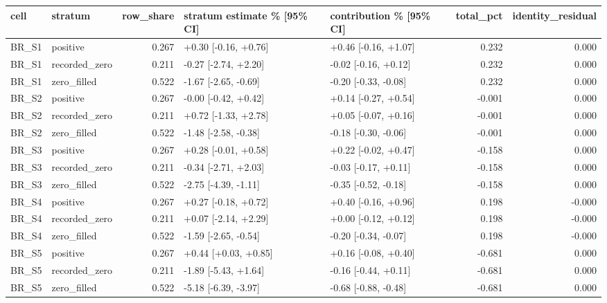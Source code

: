 \begin{tabular}{llrllrr}
\toprule
cell & stratum & row\_share & stratum estimate \% [95\% CI] & contribution \% [95\% CI] & total\_pct & identity\_residual \\
\midrule
BR\_S1 & positive & 0.267 & +0.30 [-0.16, +0.76] & +0.46 [-0.16, +1.07] & 0.232 & 0.000 \\
BR\_S1 & recorded\_zero & 0.211 & -0.27 [-2.74, +2.20] & -0.02 [-0.16, +0.12] & 0.232 & 0.000 \\
BR\_S1 & zero\_filled & 0.522 & -1.67 [-2.65, -0.69] & -0.20 [-0.33, -0.08] & 0.232 & 0.000 \\
BR\_S2 & positive & 0.267 & -0.00 [-0.42, +0.42] & +0.14 [-0.27, +0.54] & -0.001 & 0.000 \\
BR\_S2 & recorded\_zero & 0.211 & +0.72 [-1.33, +2.78] & +0.05 [-0.07, +0.16] & -0.001 & 0.000 \\
BR\_S2 & zero\_filled & 0.522 & -1.48 [-2.58, -0.38] & -0.18 [-0.30, -0.06] & -0.001 & 0.000 \\
BR\_S3 & positive & 0.267 & +0.28 [-0.01, +0.58] & +0.22 [-0.02, +0.47] & -0.158 & 0.000 \\
BR\_S3 & recorded\_zero & 0.211 & -0.34 [-2.71, +2.03] & -0.03 [-0.17, +0.11] & -0.158 & 0.000 \\
BR\_S3 & zero\_filled & 0.522 & -2.75 [-4.39, -1.11] & -0.35 [-0.52, -0.18] & -0.158 & 0.000 \\
BR\_S4 & positive & 0.267 & +0.27 [-0.18, +0.72] & +0.40 [-0.16, +0.96] & 0.198 & -0.000 \\
BR\_S4 & recorded\_zero & 0.211 & +0.07 [-2.14, +2.29] & +0.00 [-0.12, +0.12] & 0.198 & -0.000 \\
BR\_S4 & zero\_filled & 0.522 & -1.59 [-2.65, -0.54] & -0.20 [-0.34, -0.07] & 0.198 & -0.000 \\
BR\_S5 & positive & 0.267 & +0.44 [+0.03, +0.85] & +0.16 [-0.08, +0.40] & -0.681 & 0.000 \\
BR\_S5 & recorded\_zero & 0.211 & -1.89 [-5.43, +1.64] & -0.16 [-0.44, +0.11] & -0.681 & 0.000 \\
BR\_S5 & zero\_filled & 0.522 & -5.18 [-6.39, -3.97] & -0.68 [-0.88, -0.48] & -0.681 & 0.000 \\

\end{tabular}
